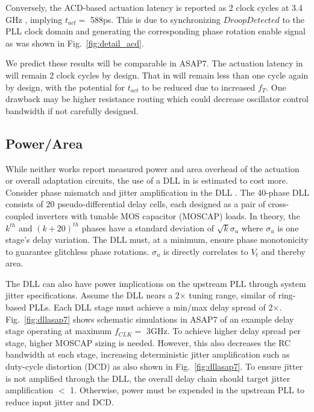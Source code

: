 \documentclass[twoside,9pt,journal,letterpage]{IEEEtran}
\begin{document}
Conversely, the ACD-based actuation latency is reported as 2 clock cycles at 3.4 GHz \cite{wilcox2015}, implying $t_{act} =$ 588ps. This is due to synchronizing $DroopDetected$ to the PLL clock domain  and generating the corresponding phase rotation enable signal as was shown in Fig.\ \ref{fig:detail_acd}.

We predict these results will be comparable in ASAP7. The actuation latency in \cite{wilcox2015} will remain 2 clock cycles by design. That in \cite{hashimoto2018} will remain less than one cycle again by design, with the potential for $t_{act}$ to be reduced due to increased $f_{T}$. One drawback may be higher resistance routing which could decrease oscillator control bandwidth if not carefully designed.

\subsection{Power/Area}
\label{sec:power_area}
While neither works report measured power and area overhead of the actuation or overall adaptation circuits, the use of a DLL in \cite{wilcox2015} is estimated to cost more. Consider phase mismatch and jitter amplification in the DLL \cite{wilcox2015}. The 40-phase DLL consists of 20 pseudo-differential delay cells, each designed as a pair of cross-coupled inverters with tunable MOS capacitor (MOSCAP) loads. In theory, the $k^{th}$ and $(k+20)^{th}$ phases have a standard deviation of $\sqrt{k} \sigma_{u}$ where $\sigma_{u}$ is one stage's delay variation. The DLL must, at a minimum, ensure phase monotonicity to guarantee glitchless phase rotations. $\sigma_{u}$ is directly correlates to $V_{t}$ and thereby area.

The DLL can also have power implications on the upstream PLL through system jitter specifications. Assume the DLL nears a 2$\times$ tuning range, similar of ring-based PLLs. Each DLL stage must achieve a min/max delay spread of 2$\times$. Fig.\ \ref{fig:dllasap7} shows schematic simulations in ASAP7 of an example delay stage operating at maximum $f_{CLK}=$ 3GHz. To achieve higher delay spread per stage, higher MOSCAP sizing is needed. However, this also decreases the RC bandwidth at each stage, increasing deterministic jitter amplification such as duty-cycle distortion (DCD) as also shown in Fig.\ \ref{fig:dllasap7}. To ensure jitter is not amplified through the DLL, the overall delay chain should target jitter amplification $<$ 1. Otherwise, power must be expended in the upstream PLL to reduce input jitter and DCD.
\end{document}
